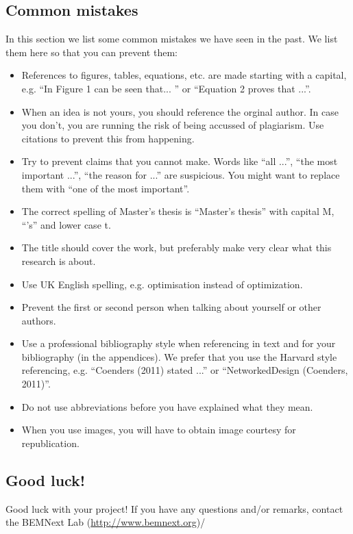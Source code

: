 \documentclass{latex-format/stylesheets/BEMNextstyle}
\begin{document}
\subsection*{Common mistakes}
\label{common_mistakes}
In this section we list some common mistakes we have seen in the past. We list them here so that you can prevent them:
\begin{itemize}
\item References to figures, tables, equations, etc. are made starting with a capital, e.g. ``In Figure 1 can be seen that... '' or ``Equation 2 proves that ...''.
\item When an idea is not yours, you should reference the orginal author. In case you don't, you are running the risk of being accussed of plagiarism. Use citations to prevent this from happening.
\item Try to prevent claims that you cannot make. Words like ``all ...'', ``the most important ...'', ``the reason for ...'' are suspicious. You might want to replace them with ``one of the most important''.
\item The correct spelling of Master's thesis is ``Master's thesis'' with capital M, ``'s'' and lower case t.
\item The title should cover the work, but preferably make very clear what this research is about.
\item Use UK English spelling, e.g. optimisation instead of optimization.
\item Prevent the first or second person when talking about yourself or other authors.
\item Use a professional bibliography style when referencing in text and for your bibliography (in the appendices). We prefer that you use the Harvard style referencing, e.g. ``Coenders (2011) stated ...'' or ``NetworkedDesign (Coenders, 2011)''. 
\item Do not use abbreviations before you have explained what they mean.
\item When you use images, you will have to obtain image courtesy for republication.
\end{itemize}

\subsection*{Good luck!}
Good luck with your project! If you have any questions and/or remarks, contact the BEMNext Lab (\url{http://www.bemnext.org})/
\end{document}
